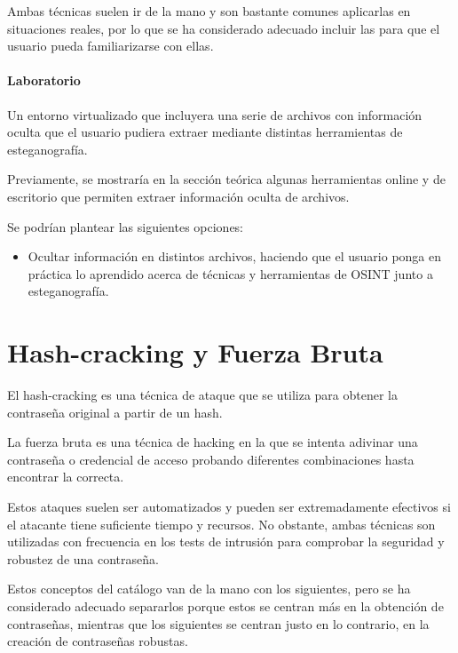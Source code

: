         Ambas técnicas suelen ir de la mano y son bastante comunes aplicarlas en situaciones reales, por lo que se ha considerado adecuado incluir las para que el usuario pueda familiarizarse con ellas.
            
        \paragraph{Laboratorio}

            Un entorno virtualizado que incluyera una serie de archivos con información oculta que el usuario pudiera extraer mediante distintas herramientas de esteganografía.

            Previamente, se mostraría en la sección teórica algunas herramientas online y de escritorio que permiten extraer información oculta de archivos.

            Se podrían plantear las siguientes opciones:
            
            \begin{itemize}
                \item Ocultar información en distintos archivos, haciendo que el usuario ponga en práctica lo aprendido acerca de técnicas y herramientas de OSINT junto a esteganografía.
            \end{itemize}

        
    \section{Hash-cracking y Fuerza Bruta}

        El hash-cracking es una técnica de ataque que se utiliza para obtener la contraseña original a partir de un hash.

        La fuerza bruta es una técnica de hacking en la que se intenta adivinar una contraseña o credencial de acceso probando diferentes combinaciones hasta encontrar la correcta.
        
        Estos ataques suelen ser automatizados y pueden ser extremadamente efectivos si el atacante tiene suficiente tiempo y recursos. No obstante, ambas técnicas son utilizadas con frecuencia en los tests de intrusión para comprobar la seguridad y robustez de una contraseña.

        Estos conceptos del catálogo van de la mano con los siguientes, pero se ha considerado adecuado separarlos porque estos se centran más en la obtención de contraseñas, mientras que los siguientes se centran justo en lo contrario, en la creación de contraseñas robustas. 

